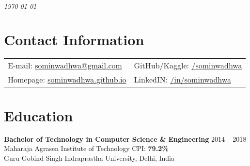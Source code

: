 \documentclass[margin,line]{res}
\begin{document}
 \hfill {\em \today}

\begin{resume}
\section{\sc Contact Information}

\vspace{.025in}
\begin{tabular}{@{}p{3.5in}p{3in}}
{E-mail:}  \href{mailto:sominwadhwa@gmail.com}{sominwadhwa@gmail.com} & {GitHub/Kaggle:} {\href{https://github.com/sominwadhwa}{\underline{/sominwadhwa}}}\\
{Homepage:} {\href{https://sominwadhwa.github.io}{sominwadhwa.github.io}} & {LinkedIN:} {\href{https://www.linkedin.com/in/sominwadhwa/}{\underline{/in/sominwadhwa}}}\\
\end{tabular}

\section{\sc Education}
{\bf Bachelor of Technology in Computer Science \& Engineering} \hfill  2014 -- 2018\\
Maharaja Agrasen Institute of Technology \hfill CPI: {\bf 79.2\%}\\
Guru Gobind Singh Indraprastha University, Delhi, India


\end{resume}
\end{document}
